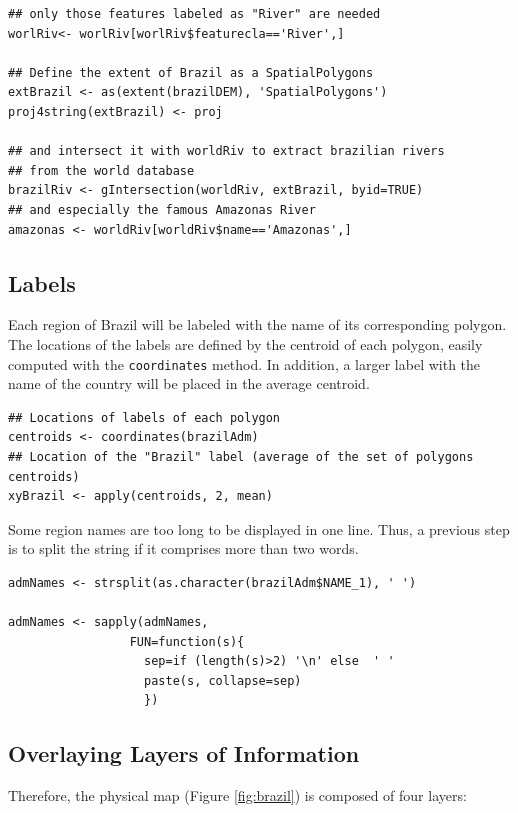 \documentclass[smallroyalvopaper]{memoir}
\begin{document}

\lstset{language=R,numbers=none}
\begin{lstlisting}
## only those features labeled as "River" are needed
worlRiv<- worlRiv[worlRiv$featurecla=='River',]

## Define the extent of Brazil as a SpatialPolygons
extBrazil <- as(extent(brazilDEM), 'SpatialPolygons')
proj4string(extBrazil) <- proj

## and intersect it with worldRiv to extract brazilian rivers
## from the world database
brazilRiv <- gIntersection(worldRiv, extBrazil, byid=TRUE)
## and especially the famous Amazonas River
amazonas <- worldRiv[worldRiv$name=='Amazonas',]
\end{lstlisting}
\subsection{Labels}
\label{sec-1-3}
Each region of Brazil will be labeled with the name of its
corresponding polygon. The locations of the labels are defined by the
centroid of each polygon, easily computed with the \texttt{coordinates}
method. In addition, a larger label with the name of the country will be
placed in the average centroid.


\lstset{language=R,numbers=none}
\begin{lstlisting}
## Locations of labels of each polygon
centroids <- coordinates(brazilAdm)
## Location of the "Brazil" label (average of the set of polygons centroids)
xyBrazil <- apply(centroids, 2, mean)
\end{lstlisting}

Some region names are too long to be displayed in one line. Thus, a
previous step is to split the string if it comprises more than two
words.


\lstset{language=R,numbers=none}
\begin{lstlisting}
admNames <- strsplit(as.character(brazilAdm$NAME_1), ' ')

admNames <- sapply(admNames,
                 FUN=function(s){
                   sep=if (length(s)>2) '\n' else  ' '
                   paste(s, collapse=sep)
                   })
\end{lstlisting}
\subsection{Overlaying Layers of Information}
\label{sec-1-4}
Therefore, the physical map (Figure \ref{fig:brazil}) is composed
of four layers: 
\end{document}
